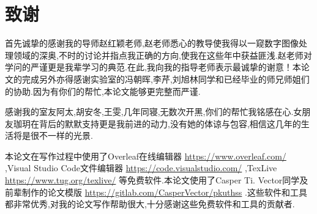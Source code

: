 
\chapter{致谢}
首先诚挚的感谢我的导师赵红颖老师,赵老师悉心的教导使我得以一窥数字图像处理领域的深奥,不时的讨论并指点我正确的方向,使我在这些年中获益匪浅.赵老师对学问的严谨更是我辈学习的典范.在此,我向我的指导老师表示最诚挚的谢意！本论文的完成另外亦得感谢实验室的冯朝晖,李芹,刘旭林同学和已经毕业的师兄师姐们的协助.因为有你们的帮忙,本论文能够更完整而严谨.
\par
感谢我的室友阿太,胡安冬,王雯,几年同寝,无数次开黑,你们的帮忙我铭感在心.女朋友珈玥在背后的默默支持更是我前进的动力,没有她的体谅与包容,相信这几年的生活将是很不一样的光景.
\par
本论文在写作过程中使用了Overleaf在线编辑器 \url{https://www.overleaf.com/} ,Visual Studio Code文件编辑器 \url{https://code.visualstudio.com/} ,TexLive \url{https://www.tug.org/texlive/} 等免费软件.本论文使用了Casper Ti. Vector同学及前辈制作的论文模版 \url{https://gitlab.com/CasperVector/pkuthss} .这些软件和工具都非常优秀,对我的论文写作帮助很大,十分感谢这些免费软件和工具的贡献者.

